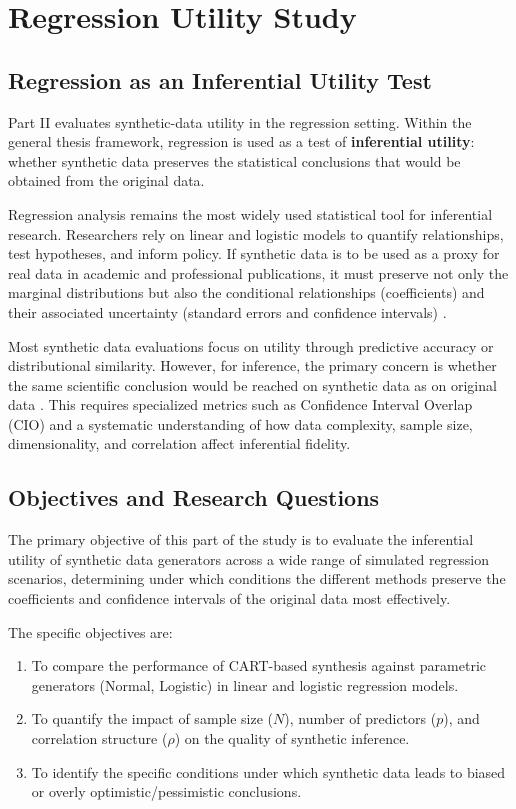 \chapter{Regression Utility Study}
\label{chap:regression-introduction}

\section{Regression as an Inferential Utility Test}
\label{sec:reg-motivation}

Part II evaluates synthetic-data utility in the regression setting. Within the general thesis framework, regression is used as a test of \textbf{inferential utility}: whether synthetic data preserves the statistical conclusions that would be obtained from the original data.

Regression analysis remains the most widely used statistical tool for inferential research. Researchers rely on linear and logistic models to quantify relationships, test hypotheses, and inform policy. If synthetic data is to be used as a proxy for real data in academic and professional publications, it must preserve not only the marginal distributions but also the conditional relationships (coefficients) and their associated uncertainty (standard errors and confidence intervals) \cite{reiter2003, drechsler2011}.

Most synthetic data evaluations focus on utility through predictive accuracy or distributional similarity. However, for inference, the primary concern is whether the same scientific conclusion would be reached on synthetic data as on original data \cite{snoke2018}. This requires specialized metrics such as Confidence Interval Overlap (CIO) and a systematic understanding of how data complexity, sample size, dimensionality, and correlation affect inferential fidelity.

\section{Objectives and Research Questions}
\label{sec:reg-purpose}

The primary objective of this part of the study is to evaluate the inferential utility of synthetic data generators across a wide range of simulated regression scenarios, determining under which conditions the different methods preserve the coefficients and confidence intervals of the original data most effectively.

The specific objectives are:
\begin{enumerate}
    \item To compare the performance of CART-based synthesis against parametric generators (Normal, Logistic) in linear and logistic regression models.
    \item To quantify the impact of sample size ($N$), number of predictors ($p$), and correlation structure ($\rho$) on the quality of synthetic inference.
    \item To identify the specific conditions under which synthetic data leads to biased or overly optimistic/pessimistic conclusions.
\end{enumerate}

